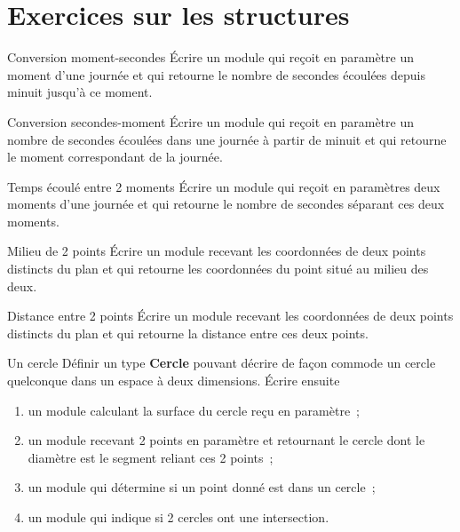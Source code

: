 	\section{Exercices sur les structures}
	
		\begin{Exercice}{Conversion moment-secondes}
			Écrire un module qui reçoit en paramètre un
			moment d’une journée et qui retourne le nombre de secondes écoulées
			depuis minuit jusqu’à ce moment.
		\end{Exercice}
		
		\begin{Exercice}{Conversion secondes-moment}
			Écrire un module qui reçoit en paramètre un
			nombre de secondes écoulées dans une journée à partir de minuit et qui
			retourne le moment correspondant de la journée.
		\end{Exercice}
		
		\begin{Exercice}{Temps écoulé entre 2 moments}
			Écrire un module qui reçoit en paramètres deux
			moments d’une journée et qui retourne le nombre de secondes séparant
			ces deux moments.
		\end{Exercice}
		
		\begin{Exercice}{Milieu de 2 points}
			Écrire un module recevant les coordonnées de
			deux points distincts du plan et qui retourne les coordonnées du point
			situé au milieu des deux.
		\end{Exercice}
		
		\begin{Exercice}{Distance entre 2 points}
			Écrire un module recevant les coordonnées de
			deux points distincts du plan et qui retourne
			la distance entre ces deux points.
		\end{Exercice}
		
		\begin{Exercice}{Un cercle}
			Définir un type \textbf{Cercle} pouvant décrire de façon
			commode un cercle quelconque dans un espace à deux dimensions. 	
			Écrire ensuite
			
			\begin{enumerate}[label=\alph*)]
			\item {
				un module calculant la surface du cercle reçu en paramètre~;}
			\item {
				un module recevant 2 points en paramètre et retournant le cercle dont le
				diamètre est le segment reliant ces 2 points~;}
			\item {
				un module qui détermine si un point donné est dans un cercle~;}
			\item {
				un module qui indique si 2 cercles ont une intersection.
			}
			\end{enumerate}
		\end{Exercice}
		
